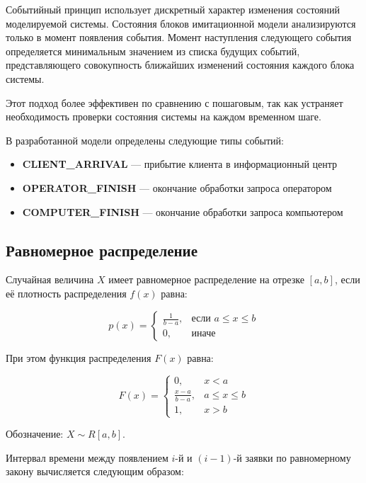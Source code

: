 Событийный принцип использует дискретный характер изменения состояний моделируемой системы. Состояния блоков имитационной модели анализируются только в момент появления события. Момент наступления следующего события определяется минимальным значением из списка будущих событий, представляющего совокупность ближайших изменений состояния каждого блока системы.

Этот подход более эффективен по сравнению с пошаговым, так как устраняет необходимость проверки состояния системы на каждом временном шаге.

В разработанной модели определены следующие типы событий:

\begin{itemize}
    \item \textbf{CLIENT\_ARRIVAL} — прибытие клиента в информационный центр
    \item \textbf{OPERATOR\_FINISH} — окончание обработки запроса оператором
    \item \textbf{COMPUTER\_FINISH} — окончание обработки запроса компьютером
\end{itemize}

\subsection{Равномерное распределение}

Случайная величина $X$ имеет равномерное распределение на отрезке $[a, b]$, если её плотность распределения $f(x)$ равна:

\begin{equation}
p(x) = \begin{cases}
\frac{1}{b-a}, & \text{если } a \leq x \leq b \\
0, & \text{иначе}
\end{cases}
\end{equation}

При этом функция распределения $F(x)$ равна:

\begin{equation}
F(x) = \begin{cases}
0, & x < a \\
\frac{x-a}{b-a}, & a \leq x \leq b \\
1, & x > b
\end{cases}
\end{equation}

Обозначение: $X \sim R[a, b]$.

Интервал времени между появлением $i$-й и $(i-1)$-й заявки по равномерному закону вычисляется следующим образом:

